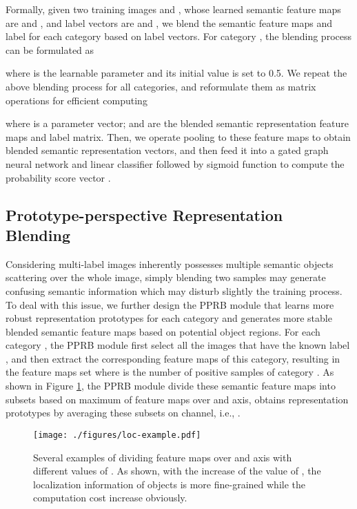 \documentclass[lettersize,journal]{IEEEtran}
\begin{document}
Formally, given two training images  and , whose learned semantic feature maps are  and , and label vectors are  and , we blend the semantic feature maps and label for each category based on label vectors. For category , the blending process can be formulated as 



where  is the learnable parameter and its initial value is set to 0.5. We repeat the above blending process for all categories, and reformulate them as matrix operations for efficient computing 


where  is a parameter vector;  and  are the blended semantic representation feature maps and label matrix. Then, we operate pooling to these feature maps to obtain blended semantic representation vectors, and then feed it into a gated graph neural network and linear classifier followed by sigmoid function to compute the probability score vector .

\subsection{Prototype-perspective Representation Blending}
Considering multi-label images inherently possesses multiple semantic objects scattering over the whole image, simply blending two samples may generate confusing semantic information which may disturb slightly the training process. To deal with this issue, we further design the PPRB module that learns more robust representation prototypes for each category and generates more stable blended semantic feature maps based on potential object regions. For each category , the PPRB module first select all the images that have the known label , and then extract the corresponding feature maps of this category, resulting in the feature maps set  where  is the number of positive samples of category . As shown in Figure \ref{fig:loc-example}, the PPRB module divide these semantic feature maps into  subsets based on maximum of feature maps over  and  axis, obtains  representation prototypes by averaging these subsets on channel, i.e., .

\begin{figure}[!h]
   \centering
   \texttt{[image: ./figures/loc-example.pdf]}
   \caption{Several examples of dividing feature maps over  and  axis with different values of . As shown, with the increase of the value of , the localization information of objects is more fine-grained while the computation cost increase obviously.}
   \label{fig:loc-example}
\end{figure}
\end{document}
